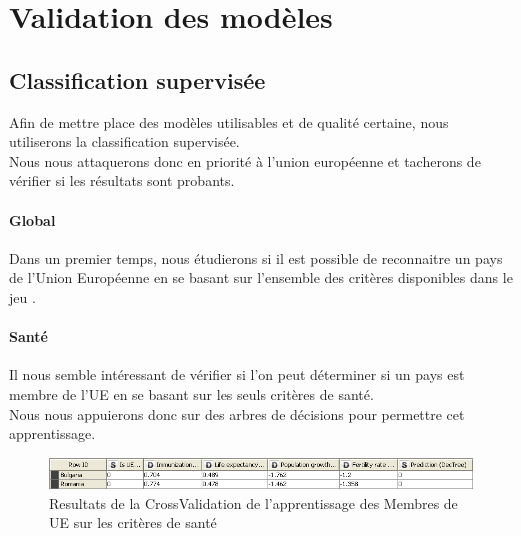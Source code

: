 \section{Validation des modèles}


\subsection{Classification supervisée}
Afin de mettre place des modèles utilisables et de qualité certaine, nous utiliserons la classification supervisée.\\
Nous nous attaquerons donc en priorité à l'union européenne et tacherons de vérifier si les résultats sont probants.

\paragraph{Global}
Dans un premier temps, nous étudierons si il est possible de reconnaitre un pays de l'Union Européenne en se basant sur l'ensemble des critères disponibles dans le jeu \jeuc .

\paragraph{Santé}
Il nous semble intéressant de vérifier si l'on peut déterminer si un pays est membre de l'UE en se basant sur les seuls critères de santé.\\
Nous nous appuierons donc sur des arbres de décisions pour permettre cet apprentissage.
\begin{figure}[H]
	\begin{center}
		\includegraphics[scale=0.5]{Image/DecisionTreeSanteBlugarieRoumanie}
		\caption{Resultats de la CrossValidation de l'apprentissage des Membres de UE sur les critères de santé}
	\end{center}
\end{figure}


